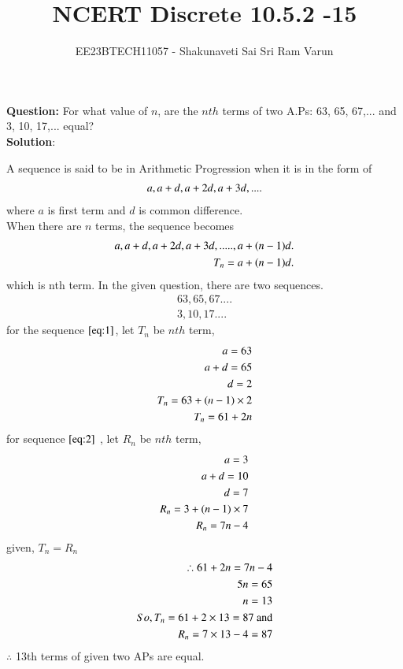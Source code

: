\documentclass[journal,12pt,twocolumn]{IEEEtran}
\theoremstyle{remark}
\begin{document}

\vspace{3cm}

\title{NCERT Discrete 10.5.2 -15}
\author{EE23BTECH11057 - Shakunaveti Sai Sri Ram Varun$^{}$%
}
\maketitle
\newpage
\bigskip

\renewcommand{\thefigure}{\theenumi}
\renewcommand{\thetable}{\theenumi}
\vspace{2cm}
\textbf{Question: }
For what value of $ n$, are the $ nth$ terms of two A.Ps: 63, 65, 67,... and 3, 10, 17,... equal?\\
\vspace{0.5cm}
\textbf{Solution}:

A sequence is said to be in Arithmetic Progression when it is in the form of
\begin{align}
\notag a, a+d, a+2d, a+3d,....
\end{align}
where $a$ is first term and $d$ is common difference.\\
When there are $ n$ terms, the sequence becomes
\begin{align}
\notag a, a+d, a+2d, a+3d,....., a+(n-1)d.\\
\notag T_n = a+(n-1)d.
\end{align}
which is nth term.
In the given question, there are two sequences.
\begin{align}
63, 65, 67....\label{eq:1}\\
3, 10, 17....\label{eq:2}
\end{align}
for the sequence $ \eqref{eq:1}$, let $ T_n$ be $ nth$ term,
\begin{align}
\notag a = 63\\
\notag a+d = 65\\
\notag d = 2\\
\notag T_n = 63 + (n-1)\times2\\
T_n = 61 + 2n \label{eq:3}
\end{align}
for sequence $ \eqref{eq:2}$ , let $ R_n$ be $ nth$ term,
\begin{align}
\notag a = 3 \\
\notag a+d = 10\\
\notag d = 7\\
\notag R_n = 3 + (n-1)\times7\\
R_n = 7n - 4 \label{eq:4}
\end{align}
given, $ T_n = R_n$\\
\begin{align}
\therefore 61 + 2n = 7n -4\\
\notag 5n = 65\\
n = 13\\
\notag So, T_n = 61 + 2\times13 = 87 \text{ and}\\
\notag R_n = 7\times13 - 4 = 87
\end{align}
$ \therefore$ 13th terms of given two APs are equal.
\end{document}
